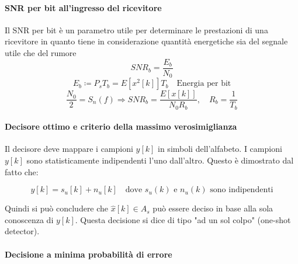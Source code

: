 \documentclass{article}
\begin{document}
\paragraph{SNR per bit all'ingresso del ricevitore}

Il SNR per bit è un parametro utile per determinare le prestazioni di una ricevitore in quanto tiene in considerazione quantità energetiche sia del segnale utile che del rumore
\[
SNR_b = \frac{E_b}{N_0} 
\]
\[
E_b \coloneqq P_s T_b = E\left[x^2[k]\right]T_b \quad \text{Energia per bit} \]
\[
\frac{N_0}{2} = S_n(f) 
\Rightarrow SNR_b = \frac{E\left[ x[k]\right]}{N_0 R_b}, \quad R_b = \frac{1}{T_b}
\]

\paragraph{Decisore ottimo e criterio della massimo verosimiglianza}

Il decisore deve mappare i campioni $y[k]$ in simboli dell'alfabeto. I campioni $y[k]$ sono statisticamente indipendenti l'uno dall'altro. Questo è dimostrato dal fatto che:

\[
y[k] = s_u[k] + n_u[k] 
\quad
\text{dove } s_u(k) \text{ e } n_u(k) \text{ sono indipendenti}
\]


\begin{center}
\end{center}

Quindi si può concludere che $\hat{x}[k] \in A_s $ può essere deciso in base alla sola conoscenza di $y[k]$. Questa decisione si dice di tipo "ad un sol colpo" (one-shot detector).

\paragraph{Decisione a minima probabilità di errore}
\end{document}
